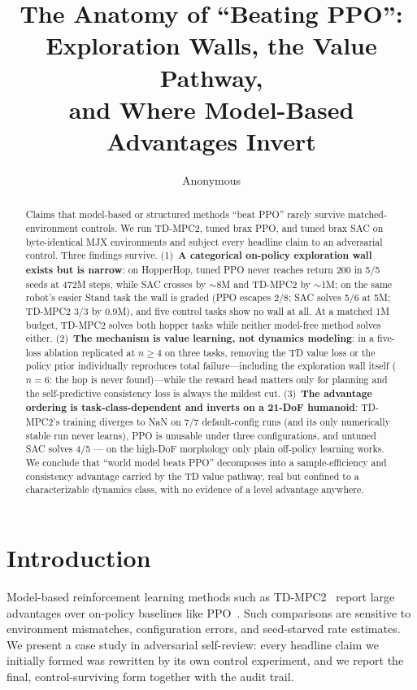 \documentclass[10pt]{article}
\title{The Anatomy of ``Beating PPO'': Exploration Walls, the Value Pathway,\\
and Where Model-Based Advantages Invert}
\author{Anonymous}
\date{}
\begin{document}
\maketitle

\begin{abstract}
Claims that model-based or structured methods ``beat PPO'' rarely survive matched-environment controls.
We run TD-MPC2, tuned brax PPO, and tuned brax SAC on byte-identical MJX environments and subject every
headline claim to an adversarial control. Three findings survive. (1)~\textbf{A categorical on-policy
exploration wall exists but is narrow}: on HopperHop, tuned PPO never reaches return 200 in 5/5 seeds at
472M steps, while SAC crosses by $\sim$8M and TD-MPC2 by $\sim$1M; on the same robot's easier Stand task the
wall is graded (PPO escapes 2/8; SAC solves 5/6 at 5M; TD-MPC2 3/3 by 0.9M), and five control tasks show no
wall at all. At a matched 1M budget, TD-MPC2 solves both hopper tasks while neither model-free method solves
either. (2)~\textbf{The mechanism is value learning, not dynamics modeling}: in a five-loss ablation replicated
at $n{\ge}4$ on three tasks, removing the TD value loss or the policy prior individually reproduces total
failure---including the exploration wall itself ($n{=}6$: the hop is never found)---while the reward head
matters only for planning and the self-predictive consistency loss is always the mildest cut.
(3)~\textbf{The advantage ordering is task-class-dependent and inverts on a 21-DoF humanoid}: TD-MPC2's
training diverges to NaN on 7/7 default-config runs (and its only numerically stable run never learns), PPO
is unusable under three configurations, and untuned SAC solves 4/5 --- on the high-DoF morphology only plain
off-policy learning works. We conclude that ``world model beats PPO'' decomposes into a sample-efficiency
and consistency advantage carried by the TD value pathway, real but confined to a characterizable dynamics
class, with no evidence of a level advantage anywhere.
\end{abstract}

\section{Introduction}
Model-based reinforcement learning methods such as TD-MPC2~\citep{hansen2024tdmpc2} report large advantages
over on-policy baselines like PPO~\citep{schulman2017ppo}. Such comparisons are sensitive to environment
mismatches, configuration errors, and seed-starved rate estimates. We present a case study in adversarial
self-review: every headline claim we initially formed was rewritten by its own control experiment, and we
report the final, control-surviving form together with the audit trail.
\end{document}
